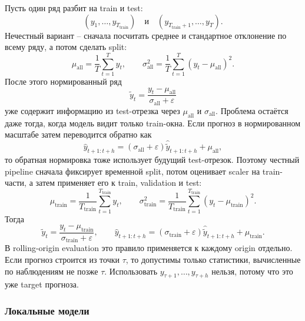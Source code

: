 \documentclass[12pt,fleqn]{article}
\begin{document}
Пусть один ряд разбит на train и test:
\begin{equation}
  (y_1,\ldots,y_{T_{\mathrm{train}}})
  \quad\text{и}\quad
  (y_{T_{\mathrm{train}}+1},\ldots,y_T).
\end{equation}
Нечестный вариант -- сначала посчитать среднее и стандартное отклонение по всему ряду, а потом сделать split:
\begin{equation}
  \mu_{\mathrm{all}} = \frac{1}{T}\sum_{t=1}^{T} y_t,
  \qquad
  \sigma_{\mathrm{all}}^2 = \frac{1}{T}\sum_{t=1}^{T}(y_t-\mu_{\mathrm{all}})^2.
\end{equation}
После этого нормированный ряд
\begin{equation}
  \widetilde{y}_t =
  \frac{y_t-\mu_{\mathrm{all}}}{\sigma_{\mathrm{all}}+\varepsilon}
\end{equation}
уже содержит информацию из test-отрезка через $\mu_{\mathrm{all}}$ и $\sigma_{\mathrm{all}}$.
Проблема остаётся даже тогда, когда модель видит только train-окна.
Если прогноз в нормированном масштабе затем переводится обратно как
\begin{equation}
  \widehat{y}_{t+1:t+h}
  =
  (\sigma_{\mathrm{all}}+\varepsilon)\widehat{\widetilde{y}}_{t+1:t+h}
  +
  \mu_{\mathrm{all}},
\end{equation}
то обратная нормировка тоже использует будущий test-отрезок.
Поэтому честный pipeline сначала фиксирует временной split, потом оценивает scaler на train-части, а затем применяет его к train, validation и test:
\begin{equation}
  \mu_{\mathrm{train}} = \frac{1}{T_{\mathrm{train}}}\sum_{t=1}^{T_{\mathrm{train}}} y_t,
  \qquad
  \sigma_{\mathrm{train}}^2 =
  \frac{1}{T_{\mathrm{train}}}\sum_{t=1}^{T_{\mathrm{train}}}(y_t-\mu_{\mathrm{train}})^2.
\end{equation}
Тогда
\begin{equation}
  \widetilde{y}_t =
  \frac{y_t-\mu_{\mathrm{train}}}{\sigma_{\mathrm{train}}+\varepsilon},
  \qquad
  \widehat{y}_{t+1:t+h}
  =
  (\sigma_{\mathrm{train}}+\varepsilon)\widehat{\widetilde{y}}_{t+1:t+h}
  +
  \mu_{\mathrm{train}}.
\end{equation}
В rolling-origin evaluation это правило применяется к каждому origin отдельно.
Если прогноз строится из точки $\tau$, то допустимы только статистики, вычисленные по наблюдениям не позже $\tau$.
Использовать $y_{\tau+1},\ldots,y_{\tau+h}$ нельзя, потому что это уже target прогноза.

\subsubsection{Локальные модели}
\end{document}
